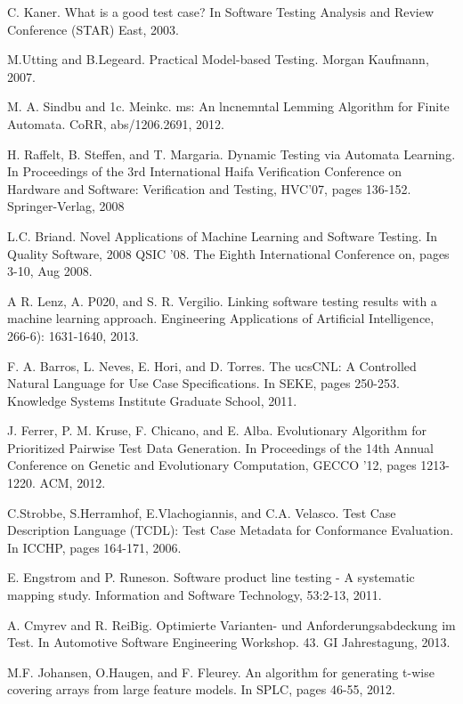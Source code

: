 \documentclass[a4paper]{article}
\begin{document}
\begin{thebibliography}{9}
C. Kaner. What is a good test case? In Software Testing Analysis and Review Conference (STAR) East, 2003.

M.Utting and B.Legeard. Practical Model-based Testing. Morgan Kaufmann, 2007.

M. A. Sindbu and 1c. Meinkc. ms: An lncnemntal Lemming Algorithm for Finite Automata. CoRR, abs/1206.2691, 2012.

H. Raffelt, B. Steffen, and T. Margaria. Dynamic Testing via Automata Learning. In Proceedings of the 3rd International Haifa Verification Conference on Hardware and Software: Verification and Testing, HVC'07, pages 136-152. Springer-Verlag, 2008

L.C. Briand. Novel Applications of Machine Learning and Software Testing. In Quality Software, 2008 QSIC '08. The Eighth International Conference on, pages 3-10, Aug 2008.

A R. Lenz, A. P020, and S. R. Vergilio. Linking software testing results with a machine learning approach. Engineering Applications of Artificial Intelligence, 266-6): 1631-1640, 2013.

F. A. Barros, L. Neves, E. Hori, and D. Torres. The ucsCNL: A Controlled Natural Language for Use Case Specifications. In SEKE, pages 250-253. Knowledge Systems Institute Graduate School, 2011.

J. Ferrer, P. M. Kruse, F. Chicano, and E. Alba. Evolutionary Algorithm for Prioritized Pairwise Test Data Generation. In Proceedings of the 14th Annual Conference on Genetic and Evolutionary Computation, GECCO '12, pages 1213-1220. ACM, 2012.

C.Strobbe, S.Herramhof, E.Vlachogiannis, and C.A. Velasco. Test Case Description Language (TCDL): Test Case Metadata for Conformance Evaluation. In ICCHP, pages 164-171, 2006.

E. Engstrom and P. Runeson. Software product line testing - A systematic mapping study. Information and Software Technology, 53:2-13, 2011.

A. Cmyrev and R. ReiBig. Optimierte Varianten- und Anforderungsabdeckung im Test. In Automotive Software Engineering Workshop. 43. GI Jahrestagung, 2013.

M.F. Johansen, O.Haugen, and F. Fleurey. An algorithm for generating t-wise covering arrays from large feature models. In SPLC, pages 46-55, 2012.


\end{thebibliography}
\end{document}
